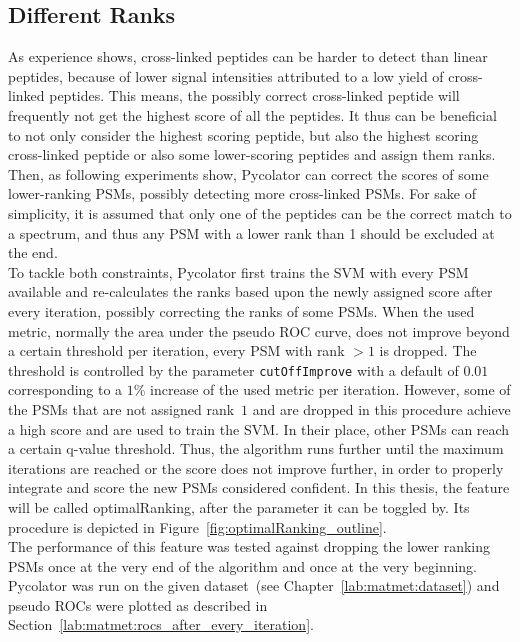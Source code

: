 \subsection{Different Ranks}
\label{lab:matmet:ranks}
As experience shows, cross-linked peptides can be harder to detect than linear peptides, because of lower signal intensities attributed to a low yield of cross-linked peptides. This means, the possibly correct cross-linked peptide will frequently not get the highest score of all the peptides. It thus can be beneficial to not only consider the highest scoring peptide, but also the highest scoring cross-linked peptide or also some lower-scoring peptides and assign them ranks. Then, as following experiments show, Pycolator can correct the scores of some lower-ranking PSMs, possibly detecting more cross-linked PSMs. For sake of simplicity, it is assumed that only one of the peptides can be the correct match to a spectrum, and thus any PSM with a lower rank than 1 should be excluded at the end.\\
To tackle both constraints, Pycolator first trains the SVM with every PSM available and re-calculates the ranks based upon the newly assigned score after every iteration, possibly correcting the ranks of some PSMs. When the used metric, normally the area under the pseudo ROC curve, does not improve beyond a certain threshold per iteration, every PSM with rank $>1$ is dropped. The threshold is controlled by the parameter \texttt{cutOffImprove} with a default of $0.01$ corresponding to a $1\%$ increase of the used metric per iteration. However, some of the PSMs that are not assigned rank~$1$ and are dropped in this procedure achieve a high score and are used to train the SVM. In their place, other PSMs can reach a certain q-value threshold. Thus, the algorithm runs further until the maximum iterations are reached or the score does not improve further, in order to properly integrate and score the new PSMs considered confident. In this thesis, the feature will be called optimalRanking, after the parameter it can be toggled by. Its procedure is depicted in Figure~\ref{fig:optimalRanking_outline}.\\
The performance of this feature was tested against dropping the lower ranking PSMs once at the very end of the algorithm and once at the very beginning. Pycolator was run on the given dataset~(see Chapter~\ref{lab:matmet:dataset}) and pseudo ROCs were plotted as described in Section~\ref{lab:matmet:rocs_after_every_iteration}.
\renewcommand{\baselinestretch}{0.9}
